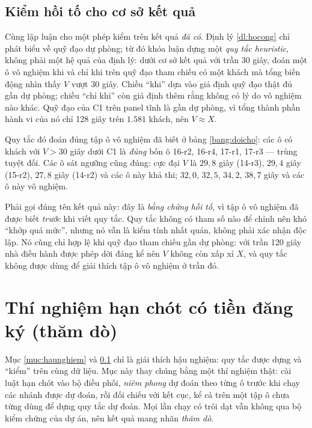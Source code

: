 \subsection{Kiểm hồi tố cho cơ sở kết quả}
\label{muc:hoito}

Cùng lập luận cho một phép kiểm trên kết quả \emph{đã có}. Định lý \ref{dl:hocong} chỉ phát biểu
về quỹ đạo dự phòng; từ đó khóa luận dựng một \emph{quy tắc heuristic}, không phải một hệ quả của
định lý: dưới cơ sở kết quả với trần 30 giây, đoán một ô vô nghiệm khi và chỉ khi trên quỹ đạo tham
chiếu có một khách mà tổng biến động nhìn thấy $V$ vượt 30 giây. Chiều ``khi'' dựa vào giả định quỹ
đạo thật đủ gần dự phòng; chiều ``chỉ khi'' còn giả định thêm rằng không có lý do vô nghiệm nào khác.
Quỹ đạo của C1 trên panel tĩnh là gần dự phòng, vì tổng thành phần hành vi của nó chỉ 128 giây trên
$1.581$ khách, nên $V \approx X$.

Quy tắc đó đoán đúng tập ô vô nghiệm đã biết ở bảng \ref{bang:doicho}: các ô có khách với $V > 30$
giây dưới C1 là \emph{đúng} bốn ô 16-r2, 16-r4, 17-r1, 17-r3 --- trùng tuyệt đối. Các ô sát ngưỡng
cũng đúng: cực đại $V$ là $29{,}8$ giây (14-r3), $29{,}4$ giây (15-r2), $27{,}8$ giây (14-r2) và các
ô này khả thi; $32{,}0$, $32{,}5$, $34{,}2$, $38{,}7$ giây và các ô này vô nghiệm.

Phải gọi đúng tên kết quả này: đây là \emph{bằng chứng hồi tố}, vì tập ô vô nghiệm đã được biết
\emph{trước} khi viết quy tắc. Quy tắc không có tham số nào để chỉnh nên khó ``khớp quá mức'', nhưng
nó vẫn là kiểm tính nhất quán, không phải xác nhận độc lập. Nó cũng chỉ hợp lệ khi quỹ đạo tham
chiếu gần dự phòng: với trần 120 giây nhà điều hành được phép dời đáng kể nên $V$ không còn xấp xỉ
$X$, và quy tắc không được dùng để giải thích tập ô vô nghiệm ở trần đó.

\section{Thí nghiệm hạn chót có tiền đăng ký (thăm dò)}
\label{muc:tang2}

Mục \ref{muc:haunghiem} và \ref{muc:hoito} chỉ là giải thích hậu nghiệm: quy tắc được dựng và
``kiểm'' trên cùng dữ liệu. Mục này thay chúng bằng một thí nghiệm thật: cài luật hạn chót vào bộ
điều phối, \emph{niêm phong} dự đoán theo từng ô trước khi chạy các nhánh được dự đoán, rồi đối chiếu
với kết cục, kể cả trên một tập ô chưa từng dùng để dựng quy tắc dự đoán. Mọi lần chạy có trôi dạt vẫn không qua bộ kiểm
chứng của dự án, nên kết quả mang nhãn \emph{thăm dò}.

